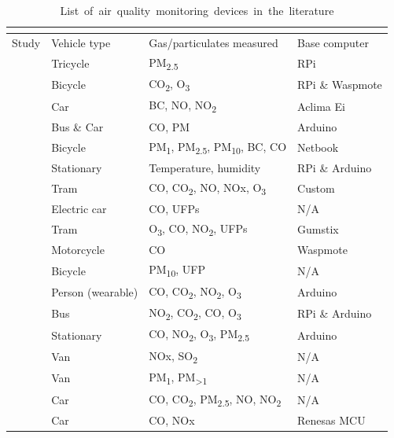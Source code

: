 \documentclass[11pt]{report}
\begin{document}
\begin{landscape}
  \footnotesize
\begin{longtable}{ p{} p{} p{} p{} }
  \caption{\mbox{List of air quality monitoring devices in the literature}}
  \vspace{-0.4cm}
  \label{listofprevdevices} \\
  \toprule
  Study & Vehicle type & Gas/particulates measured & Base computer \\ \midrule
  \cite{Jabbar2017bikefossarchitecture} & Tricycle & PM\textsubscript{2.5} & RPi \\ \midrule
  \cite{Alvear2016ecosensor} & Bicycle & CO\textsubscript{2}, O\textsubscript{3} & RPi \& Waspmote\\ \midrule
  \cite{Apte2017googlestreetview} & Car & BC, NO, NO\textsubscript{2} & Aclima Ei \\ \midrule
  \cite{Devarakonda2013} & Bus \& Car & CO, PM & Arduino \\ \midrule
  \cite{Elen2013aeroflex} & Bicycle & PM\textsubscript{1}, PM\textsubscript{2.5}, PM\textsubscript{10}, BC, CO & Netbook \\ \midrule
  \cite{Ferdoush2014rasppiandarduino} & Stationary & Temperature, humidity & RPi \& Arduino \\ \midrule
  \cite{Hagemann2014aerotram} & Tram & CO, CO\textsubscript{2}, NO, NOx, O\textsubscript{3}  & Custom \\ \midrule
  \cite{Hagler2010durhamallelectric} & Electric car & CO, UFPs & N/A \\ \midrule
  \cite{Hasenfratz2015highresmapsTram} & Tram & O\textsubscript{3}, CO, NO\textsubscript{2}, UFPs & Gumstix \\ \midrule
  \cite{Hoang2013hanoihexagons} & Motorcycle & CO & Waspmote \\ \midrule
  \cite{Peters2013cycleruns} & Bicycle & PM\textsubscript{10}, UFP & N/A \\ \midrule
  \cite{Piedrahita2014quantexposuremtrng} & Person (wearable) & CO, CO\textsubscript{2}, NO\textsubscript{2}, O\textsubscript{3} & Arduino \\ \midrule
  \cite{2014busairqualityVSN} & Bus & NO\textsubscript{2}, CO\textsubscript{2}, CO, O\textsubscript{3} & RPi \& Arduino \\ \midrule
  \cite{sun2016HKmarathonML} & Stationary & CO, NO\textsubscript{2}, O\textsubscript{3}, PM\textsubscript{2.5} & Arduino \\ \midrule
  \cite{Wallace2009mobilehamilton} & Van & NOx, SO\textsubscript{2} & N/A \\ \midrule
  \cite{Weijers2004movingmeasurementunit} & Van & PM\textsubscript{1}, PM\textsubscript{\textgreater 1} & N/A \\ \midrule
  \cite{Westerdahl2005losangeles} & Car & CO, CO\textsubscript{2}, PM\textsubscript{2.5}, NO, NO\textsubscript{2} & N/A \\ \midrule
  \cite{Wong2009envmonitoringtemporal} & Car & CO, NOx & Renesas MCU \\ \bottomrule
  \hline
\end{longtable}


\end{landscape}
\end{document}
